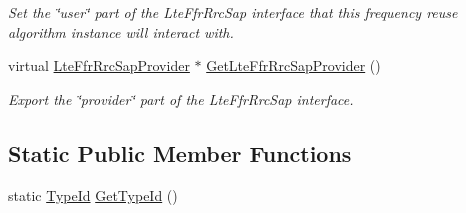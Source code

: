 \begin{DoxyCompactItemize}
\begin{DoxyCompactList}\small\item\em Set the \char`\"{}user\char`\"{} part of the Lte\+Ffr\+Rrc\+Sap interface that this frequency reuse algorithm instance will interact with. \end{DoxyCompactList}\item 
virtual \hyperlink{classns3_1_1LteFfrRrcSapProvider}{Lte\+Ffr\+Rrc\+Sap\+Provider} $\ast$ \hyperlink{classns3_1_1LteFfrSimple_a28594c8d4b42a8c16e5e8283c1fc8382}{Get\+Lte\+Ffr\+Rrc\+Sap\+Provider} ()
\begin{DoxyCompactList}\small\item\em Export the \char`\"{}provider\char`\"{} part of the Lte\+Ffr\+Rrc\+Sap interface. \end{DoxyCompactList}\end{DoxyCompactItemize}
\subsection*{Static Public Member Functions}
\begin{DoxyCompactItemize}
\item 
static \hyperlink{classns3_1_1TypeId}{Type\+Id} \hyperlink{classns3_1_1LteFfrSimple_aaefe303778e635e2daa55de8ed335429}{Get\+Type\+Id} ()
\end{DoxyCompactItemize}

